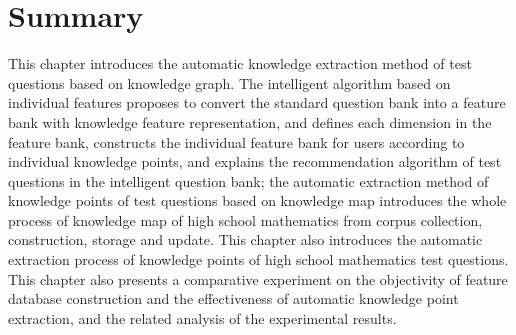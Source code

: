\section{Summary}
This chapter introduces the automatic knowledge extraction method of test questions based on knowledge graph. The intelligent algorithm based on individual features proposes to convert the standard question bank into a feature bank with knowledge feature representation, and defines each dimension in the feature bank, constructs the individual feature bank for users according to individual knowledge points, and explains the recommendation algorithm of test questions in the intelligent question bank; the automatic extraction method of knowledge points of test questions based on knowledge map introduces the whole process of knowledge map of high school mathematics from corpus collection, construction, storage and update. This chapter also introduces the automatic extraction process of knowledge points of high school mathematics test questions. This chapter also presents a comparative experiment on the objectivity of feature database construction and the effectiveness of automatic knowledge point extraction, and the related analysis of the experimental results.